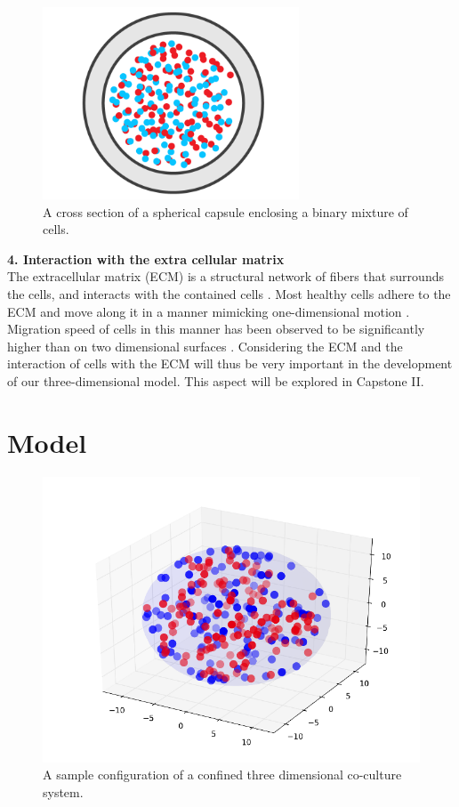 \documentclass[aps,prb,twocolumn,groupedaddress,nofootinbib,floatfix]{revtex4}
\begin{document}
\begin{figure}
  \includegraphics[width=3in]{Fig1.png}
  \caption[capsule]
   {A cross section of a spherical capsule enclosing a binary mixture of 
   cells.}
   \label{fig:capsule}
\end{figure}

{\bf 4. Interaction with the extra cellular matrix}\\
The extracellular matrix (ECM) is a structural network of fibers that surrounds the cells, and interacts with the contained 
cells \cite{Alberts}. Most healthy cells adhere to the ECM and move along it in a manner mimicking one-dimensional motion \cite{Cukierman}. 
Migration speed of cells in this manner has been observed to be significantly higher than on two dimensional surfaces
\cite{Doyle}. Considering the ECM and the interaction of cells with the ECM will thus be very 
important in the development of our three-dimensional model. This aspect will be explored in Capstone II.


\section*{Model}

\begin{figure}
  \includegraphics[width=1.0\columnwidth]{3dconf.png}
  \caption[3dconf]
    {A sample configuration of a confined three dimensional co-culture system.}
   \label{fig:3dconf}
\end{figure}
\end{document}
